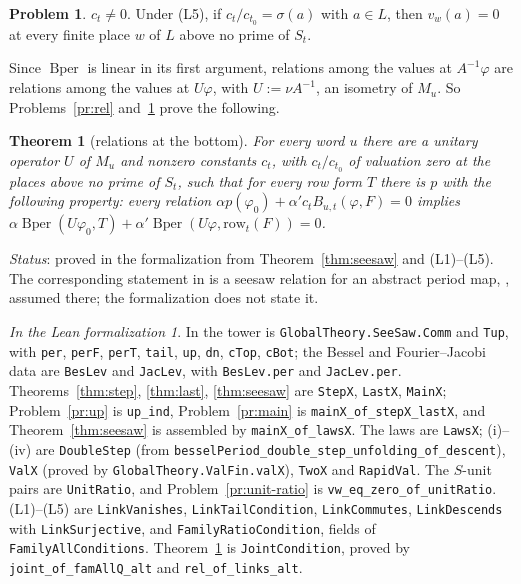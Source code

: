 \documentclass[reqno]{amsart}
\theoremstyle{definition}
\newtheorem{problem}{Problem}[section]
\theoremstyle{plain}
\newtheorem{theorem}{Theorem}[section]
\theoremstyle{remark}
\newtheorem*{leanremark}{In the Lean formalization}
\newcommand{\Bper}{\operatorname{Bper}}
\newcommand{\tl}[1]{\texttt{#1}}
\begin{document}
\begin{problem}\label{pr:rel-units}
\(c_t\ne0\).  Under (L5), if \(c_t/c_{t_0}=\sigma(a)\) with \(a\in L\), then \(v_w(a)=0\) at every finite place \(w\) of \(L\) above no prime of \(S_t\).
\end{problem}

Since \(\Bper\) is linear in its first argument, relations among the values at \(A^{-1}\varphi\) are relations among the values at \(U\varphi\), with \(U:=\nu A^{-1}\), an isometry of \(M_u\).  So Problems~\ref{pr:rel} and~\ref{pr:rel-units} prove the following.

\begin{theorem}[relations at the bottom]\label{thm:bottom}
For every word \(u\) there are a unitary operator \(U\) of \(M_u\) and nonzero constants \(c_t\), with \(c_t/c_{t_0}\) of valuation zero at the places above no prime of \(S_t\), such that for every row form \(T\) there is \(p\) with the following property: every relation \(\alpha p(\varphi_0)+\alpha'c_tB_{u,t}(\varphi,F)=0\) implies \(\alpha\Bper(U\varphi_0,T)+\alpha'\Bper(U\varphi,\mathrm{row}_t(F))=0\).
\end{theorem}
\noindent\emph{Status}: proved in the formalization from Theorem~\ref{thm:seesaw} and (L1)--(L5).  The corresponding statement in \cite{Adr} is a seesaw relation for an abstract period map, \cite[Hyp.~14.10]{Adr}, assumed there; the formalization does not state it.

\begin{leanremark}
\raggedright In \cite{Lean} the tower is \tl{GlobalTheory.SeeSaw.Comm} and \tl{Tup}, with \tl{per}, \tl{perF}, \tl{perT}, \tl{tail}, \tl{up}, \tl{dn}, \tl{cTop}, \tl{cBot}; the Bessel and Fourier--Jacobi data are \tl{BesLev} and \tl{JacLev}, with \tl{BesLev.per} and \tl{JacLev.per}.  Theorems~\ref{thm:step}, \ref{thm:last}, \ref{thm:seesaw} are \tl{StepX}, \tl{LastX}, \tl{MainX}; Problem~\ref{pr:up} is \tl{up\_ind}, Problem~\ref{pr:main} is \tl{mainX\_of\_stepX\_lastX}, and Theorem~\ref{thm:seesaw} is assembled by \tl{mainX\_of\_lawsX}.  The laws are \tl{LawsX}; (i)--(iv) are \tl{DoubleStep} (from \tl{besselPeriod\_double\_step\_unfolding\_of\_descent}), \tl{ValX} (proved by \tl{GlobalTheory.ValFin.valX}), \tl{TwoX} and \tl{RapidVal}.  The \(S\)-unit pairs are \tl{UnitRatio}, and Problem~\ref{pr:unit-ratio} is \tl{vw\_eq\_zero\_of\_unitRatio}.  (L1)--(L5) are \tl{LinkVanishes}, \tl{LinkTailCondition}, \tl{LinkCommutes}, \tl{LinkDescends} with \tl{LinkSurjective}, and \tl{FamilyRatioCondition}, fields of \tl{FamilyAllConditions}.  Theorem~\ref{thm:bottom} is \tl{JointCondition}, proved by \tl{joint\_of\_famAllQ\_alt} and \tl{rel\_of\_links\_alt}.
\end{leanremark}
\end{document}
